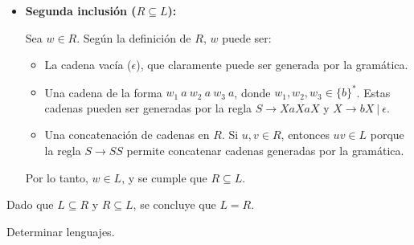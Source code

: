 \documentclass[12pt]{report} %
\begin{document}
\begin{enumerate}
\begin{solucion}[Ejercicio 1.d]
\begin{itemize}
       \item \textbf{Segunda inclusión ($R \subseteq L$):}

           Sea $w \in R$. Según la definición de $R$, $w$ puede ser:
           \begin{itemize}
               \item La cadena vacía ($\epsilon$), que claramente puede ser generada por la gramática.
               \item Una cadena de la forma $w_1 \ a \ w_2 \ a \ w_3 \ a$, donde $w_1, w_2, w_3 \in \{b\}^*$. Estas cadenas pueden ser generadas por la regla $S \to XaXaX$ y $X \to bX \ | \ \epsilon$.
               \item Una concatenación de cadenas en $R$. Si $u, v \in R$, entonces $uv \in L$ porque la regla $S \to SS$ permite concatenar cadenas generadas por la gramática.
           \end{itemize}

           Por lo tanto, $w \in L$, y se cumple que $R \subseteq L$.
   \end{itemize}

   Dado que $L \subseteq R$ y $R \subseteq L$, se concluye que $L = R$.

   \end{solucion}
\end{enumerate}

\begin{ejercicio}
Determinar lenguajes.
\end{ejercicio}
\end{document}

